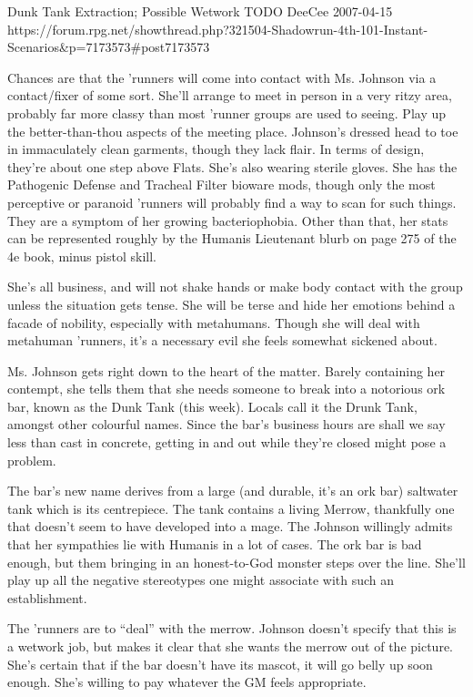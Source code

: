 \begin{scenario}{Dunk Tank}
	{Extraction; Possible Wetwork}
	{TODO}
	{DeeCee}
	{2007-04-15}
	{https://forum.rpg.net/showthread.php?321504-Shadowrun-4th-101-Instant-Scenarios\&p=7173573\#post7173573}

  Chances are that the 'runners will come into contact with Ms. Johnson via a contact/fixer of some sort. She'll arrange to meet in person in a very ritzy area, probably far more classy than most 'runner groups are used to seeing. Play up the better-than-thou aspects of the meeting place. Johnson's dressed head to toe in immaculately clean garments, though they lack flair. In terms of design, they're about one step above Flats. She's also wearing sterile gloves. She has the Pathogenic Defense and Tracheal Filter bioware mods, though only the most perceptive or paranoid 'runners will probably find a way to scan for such things. They are a symptom of her growing bacteriophobia. Other than that, her stats can be represented roughly by the Humanis Lieutenant blurb on page 275 of the 4e book, minus pistol skill.

She's all business, and will not shake hands or make body contact with the group unless the situation gets tense. She will be terse and hide her emotions behind a facade of nobility, especially with metahumans. Though she will deal with metahuman 'runners, it's a necessary evil she feels somewhat sickened about.

\synopsis  Ms. Johnson gets right down to the heart of the matter. Barely containing her contempt, she tells them that she needs someone to break into a notorious ork bar, known as the Dunk Tank (this week). Locals call it the Drunk Tank, amongst other colourful names. Since the bar's business hours are shall we say less than cast in concrete, getting in and out while they're closed might pose a problem.

The bar's new name derives from a large (and durable, it's an ork bar) saltwater tank which is its centrepiece. The tank contains a living Merrow, thankfully one that doesn't seem to have developed into a mage. The Johnson willingly admits that her sympathies lie with Humanis in a lot of cases. The ork bar is bad enough, but them bringing in an honest-to-God monster steps over the line. She'll play up all the negative stereotypes one might associate with such an establishment.

The 'runners are to ``deal'' with the merrow. Johnson doesn't specify that this is a wetwork job, but makes it clear that she wants the merrow out of the picture. She's certain that if the bar doesn't have its mascot, it will go belly up soon enough. She's willing to pay whatever the GM feels appropriate.


\end{scenario}
